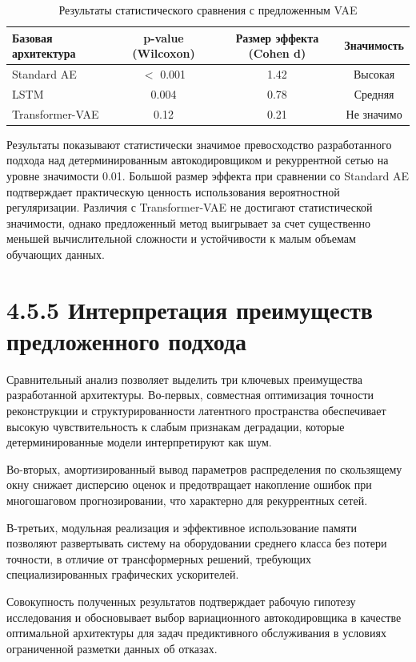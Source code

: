\documentclass[14pt, a4paper, oneside]{extreport}
\begin{document}
\begin{table}[htbp]
\centering
\caption{Результаты статистического сравнения с предложенным VAE}
\label{tab:statistical_comparison}
\begin{tabular}{lccc}
\hline
Базовая архитектура & p-value (Wilcoxon) & Размер эффекта (Cohen d) & Значимость \\
\hline
Standard AE & $<$ 0.001 & 1.42 & Высокая \\
LSTM & 0.004 & 0.78 & Средняя \\
Transformer-VAE & 0.12 & 0.21 & Не значимо \\
\hline
\end{tabular}
\end{table}

Результаты показывают статистически значимое превосходство разработанного подхода над детерминированным автокодировщиком и рекуррентной сетью на уровне значимости 0.01. Большой размер эффекта при сравнении со Standard AE подтверждает практическую ценность использования вероятностной регуляризации. Различия с Transformer-VAE не достигают статистической значимости, однако предложенный метод выигрывает за счет существенно меньшей вычислительной сложности и устойчивости к малым объемам обучающих данных.

\vspace{1em}
\section{4.5.5 Интерпретация преимуществ предложенного подхода}
\vspace{1em}

Сравнительный анализ позволяет выделить три ключевых преимущества разработанной архитектуры. Во-первых, совместная оптимизация точности реконструкции и структурированности латентного пространства обеспечивает высокую чувствительность к слабым признакам деградации, которые детерминированные модели интерпретируют как шум.

Во-вторых, амортизированный вывод параметров распределения по скользящему окну снижает дисперсию оценок и предотвращает накопление ошибок при многошаговом прогнозировании, что характерно для рекуррентных сетей.

В-третьих, модульная реализация и эффективное использование памяти позволяют развертывать систему на оборудовании среднего класса без потери точности, в отличие от трансформерных решений, требующих специализированных графических ускорителей.

Совокупность полученных результатов подтверждает рабочую гипотезу исследования и обосновывает выбор вариационного автокодировщика в качестве оптимальной архитектуры для задач предиктивного обслуживания в условиях ограниченной разметки данных об отказах.
\end{document}
